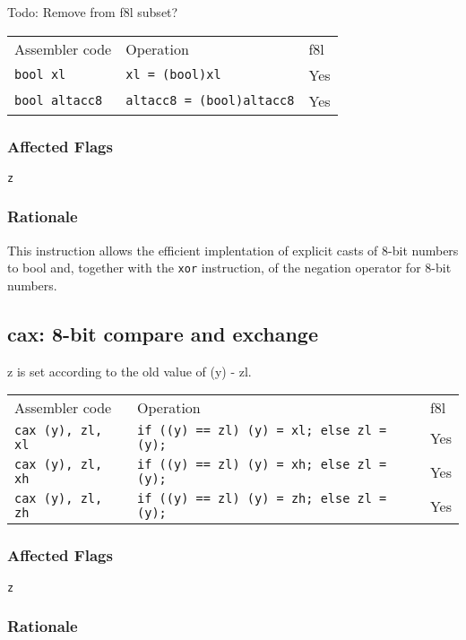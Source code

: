 \documentclass{book}
\begin{document}
Todo: Remove from f8l subset?

\begin{tabular}{l l l}
Assembler code        & Operation                        & f8l \\
\texttt{bool xl}      & \texttt{xl = (bool)xl}           & Yes \\
\texttt{bool altacc8} & \texttt{altacc8 = (bool)altacc8} & Yes \\
\end{tabular}

\subsubsection*{Affected Flags}

\texttt{z}

\subsubsection*{Rationale}

This instruction allows the efficient implentation of explicit casts of 8-bit numbers to bool and, together with the \texttt{xor} instruction, of the negation operator for 8-bit numbers.


\subsection{cax: 8-bit compare and exchange}

z is set according to the old value of (y) - zl.

\begin{tabular}{l l l}
Assembler code            & Operation                                        & f8l \\
\texttt{cax (y), zl, xl}  & \texttt{if ((y) == zl) (y) = xl; else zl = (y);} & Yes \\
\texttt{cax (y), zl, xh}  & \texttt{if ((y) == zl) (y) = xh; else zl = (y);} & Yes \\
\texttt{cax (y), zl, zh}  & \texttt{if ((y) == zl) (y) = zh; else zl = (y);} & Yes
\end{tabular}

\subsubsection*{Affected Flags}

\texttt{z}

\subsubsection*{Rationale}
\end{document}
